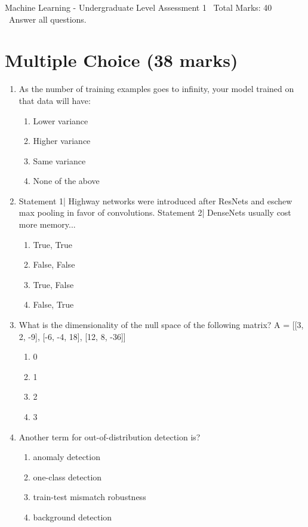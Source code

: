 \documentclass[12pt]{article}
\begin{document}
\begin{center}
Machine Learning - Undergraduate Level Assessment 1 \
Total Marks: 40 \
Answer all questions.
\end{center}

\section*{Multiple Choice (38 marks)}
\begin{enumerate}[label=\arabic*.]
\item As the number of training examples goes to infinity, your model trained on that data will have:
\begin{enumerate}[label=(\alph*)]
    \item Lower variance
    \item Higher variance
    \item Same variance
    \item None of the above
\end{enumerate}
\item Statement 1| Highway networks were introduced after ResNets and eschew max pooling in favor of convolutions. Statement 2| DenseNets usually cost more memory...
\begin{enumerate}[label=(\alph*)]
    \item True, True
    \item False, False
    \item True, False
    \item False, True
\end{enumerate}
\item What is the dimensionality of the null space of the following matrix? A = [[3, 2, -9], [-6, -4, 18], [12, 8, -36]]
\begin{enumerate}[label=(\alph*)]
    \item 0
    \item 1
    \item 2
    \item 3
\end{enumerate}
\item Another term for out-of-distribution detection is?
\begin{enumerate}[label=(\alph*)]
    \item anomaly detection
    \item one-class detection
    \item train-test mismatch robustness
    \item background detection
\end{enumerate}

\end{enumerate}
\end{document}
